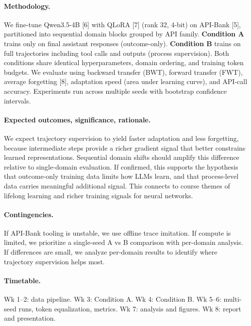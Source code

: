 \documentclass{article}
\begin{document}
\vspace{0.05cm}
\paragraph{Methodology.}
We fine-tune Qwen3.5-4B [6] with QLoRA [7] (rank 32, 4-bit) on API-Bank [5], partitioned into sequential domain blocks grouped by API family. \textbf{Condition A} trains only on final assistant responses (outcome-only). \textbf{Condition B} trains on full trajectories including tool calls and outputs (process supervision). Both conditions share identical hyperparameters, domain ordering, and training token budgets. We evaluate using backward transfer (BWT), forward transfer (FWT), average forgetting [8], adaptation speed (area under learning curve), and API-call accuracy. Experiments run across multiple seeds with bootstrap confidence intervals.

\paragraph{Expected outcomes, significance, rationale.}
We expect trajectory supervision to yield faster adaptation and less forgetting, because intermediate steps provide a richer gradient signal that better constrains learned representations. Sequential domain shifts should amplify this difference relative to single-domain evaluation. If confirmed, this supports the hypothesis that outcome-only training data limits how LLMs learn, and that process-level data carries meaningful additional signal. This connects to course themes of lifelong learning and richer training signals for neural networks.

\paragraph{Contingencies.}
If API-Bank tooling is unstable, we use offline trace imitation. If compute is limited, we prioritize a single-seed A vs B comparison with per-domain analysis. If differences are small, we analyze per-domain results to identify where trajectory supervision helps most.

\paragraph{Timetable.}
Wk 1--2: data pipeline. Wk 3: Condition A. Wk 4: Condition B. Wk 5--6: multi-seed runs, token equalization, metrics. Wk 7: analysis and figures. Wk 8: report and presentation.
\end{document}
